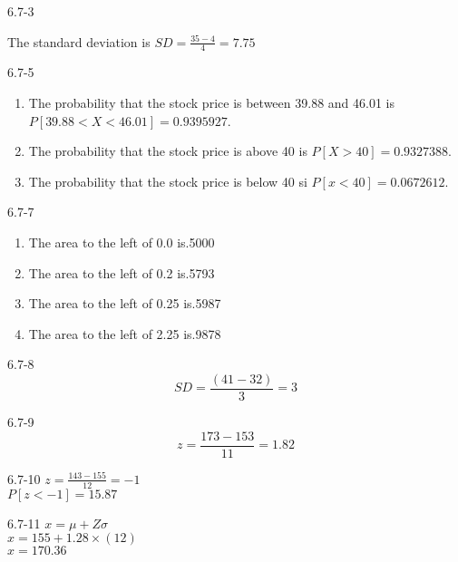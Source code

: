 \begin{exsol@solution}{6.7-3}


    The standard deviation is $SD = \frac{35 - 4}{4} = 7.75$
\end{exsol@solution}
\begin{exsol@solution}{6.7-5}

\begin{enumerate}
\item The probability that the stock price is between 39.88 and 46.01 is $P[39.88 < X < 46.01] = 0.9395927$.
\item The probability that the stock price is above 40 is $P[X > 40] = 0.9327388$.
\item The probability that the stock price is below 40 si $P[ x < 40] = 0.0672612$.
\end{enumerate}
\end{exsol@solution}
\begin{exsol@solution}{6.7-7}
\begin{enumerate}
\item The area to the left of 0.0 is.5000
\item The area to the left of 0.2 is.5793
\item The area to the left of 0.25 is.5987
\item The area to the left of 2.25 is.9878
\end{enumerate}
\end{exsol@solution}
\begin{exsol@solution}{6.7-8}
	  \begin{equation}
	    SD = \frac{(41 - 32)}{3} = 3
	  \end{equation}
	
\end{exsol@solution}
\begin{exsol@solution}{6.7-9}
	  \begin{equation*}
	    z = \frac{173 - 153}{11} = 1.82
	  \end{equation*}
	
\end{exsol@solution}
\begin{exsol@solution}{6.7-10}
	    $z = \frac{143 - 155}{12} = -1$ \\
	    $P[z < -1] = 15.87$

\end{exsol@solution}
\begin{exsol@solution}{6.7-11}
	    $x = \mu + Z \sigma$ \\
	    $x = 155 + 1.28 \times (12) $ \\
	    $x = 170.36$

\end{exsol@solution}
